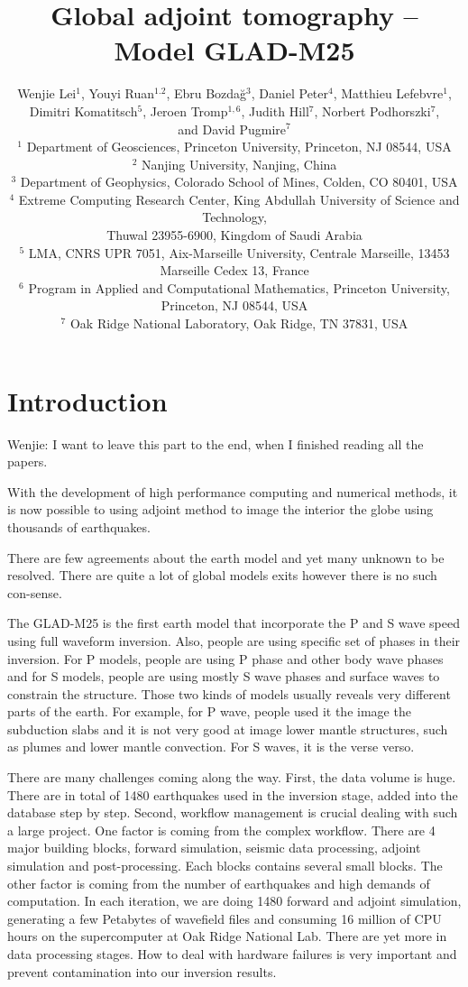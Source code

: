 \documentclass[extra,mreferee]{gji}
\title[Global Adjoint Tomography -- Model GLAD-M25]
  {Global adjoint tomography -- Model GLAD-M25}
\author[Lei et al.]
  {Wenjie Lei$^1$, Youyi Ruan$^{1.2}$, Ebru Bozda\u g$^3$, Daniel Peter$^4$, Matthieu Lefebvre$^1$, \\{\LARGE \rm Dimitri Komatitsch$^5$, Jeroen Tromp$^{1,6}$, Judith Hill$^7$, Norbert Podhorszki$^7$}, \\ {\LARGE \rm and David Pugmire$^7$} \\
  $^1$ Department of Geosciences, Princeton University, Princeton, NJ 08544, USA\\
  $^2$ Nanjing University, Nanjing, China\\
  $^3$ Department of Geophysics, Colorado School of Mines, Colden, CO 80401, USA\\
  $^4$ Extreme Computing Research Center, King Abdullah University of Science and Technology, \\Thuwal 23955-6900, Kingdom of Saudi Arabia\\
  $^5$ LMA, CNRS UPR 7051, Aix-Marseille University, Centrale Marseille, 13453 Marseille Cedex 13, France\\
  $^6$ Program in Applied and Computational Mathematics, Princeton University, Princeton, NJ 08544, USA\\
  $^7$ Oak Ridge National Laboratory, Oak Ridge, TN 37831, USA\\
  }
\begin{document}
\maketitle

\section{Introduction}

{\color{Red} Wenjie: I want to leave this part to the end, when I finished reading all the papers.}

With the development of high performance computing and numerical methods, it is now possible to using adjoint method to image the interior the globe using thousands of earthquakes.

There are few agreements about the earth model and yet many unknown to be resolved. There are quite a lot of global models exits however there is no such con-sense.

The GLAD-M25 is the first earth model that incorporate the P and S wave speed using full waveform inversion. Also, people are using specific set of phases in their inversion. For P models, people are using P phase and other body wave phases and for S models, people are using mostly S wave phases and surface waves to constrain the structure. Those two kinds of models usually reveals very different parts of the earth. For example, for P wave, people used it the image the subduction slabs and it is not very good at image lower mantle structures, such as plumes and lower mantle convection. For S waves, it is the verse verso.

There are many challenges coming along the way. First, the data volume is huge.  There are in total of 1480 earthquakes used in the inversion stage, added into the database step by step. Second, workflow management is crucial dealing with such a large project. One factor is coming from the complex workflow. There are 4 major building blocks, forward simulation, seismic data processing, adjoint simulation and post-processing. Each blocks contains several small blocks. The other factor is coming from the number of earthquakes and high demands of computation. In each iteration, we are doing 1480 forward and adjoint simulation, generating a few Petabytes of wavefield files and consuming 16 million of CPU hours on the supercomputer at Oak Ridge National Lab. There are yet more in data processing stages. How to deal with hardware failures is very important and prevent contamination into our inversion results.
\end{document}
